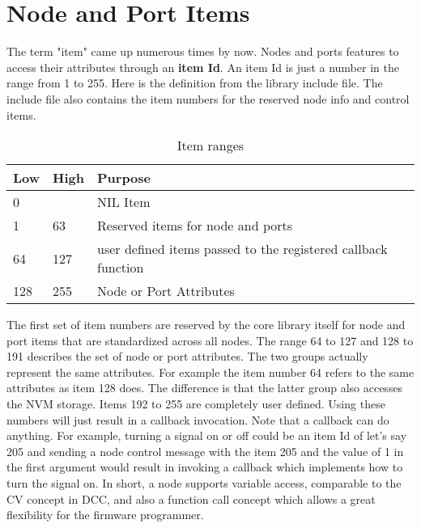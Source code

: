 \section{Node and Port Items}

The term "item" came up numerous times by now. Nodes and ports features to access their attributes through an \textbf{item Id}. An item Id is just a number in the range from 1 to 255. Here is the definition from the library include file. The include file also contains the item numbers for the reserved node info and control items.

\begin{table}[!ht]
    \begin{center}
        \caption{Item ranges}
        \begin{tabular}{|l|l|p{}|}
            \toprule
            \textbf{Low} & \textbf{High} & \textbf{Purpose} \\
            \midrule
            0 & & NIL Item \\
            \midrule
            1 & 63 & Reserved items for node and ports \\
            \midrule
            64 & 127 & user defined items passed to the registered callback function \\
            \midrule
            128 & 255 & Node or Port Attributes \\
            \bottomrule
        \end{tabular}
    \end{center}
\end{table}

The first set of item numbers are reserved by the core library itself for node and port items that are standardized across all nodes. The range 64 to 127 and 128 to 191 describes the set of node or port attributes. The two groups actually represent the same attributes. For example the item number 64 refers to the same attributes as item 128 does. The difference is that the latter group also accesses the NVM storage. Items 192 to 255 are completely user defined. Using these numbers will just result in a callback invocation. Note that a callback can do anything. For example, turning a signal on or off could be an item Id of let's say 205 and sending a node control message with the item 205 and the value of 1 in the first argument would result in invoking a callback which implements how to turn the signal on. In short, a node supports variable access, comparable to the CV concept in DCC, and also a function call concept which allows a great flexibility for the firmware programmer.

